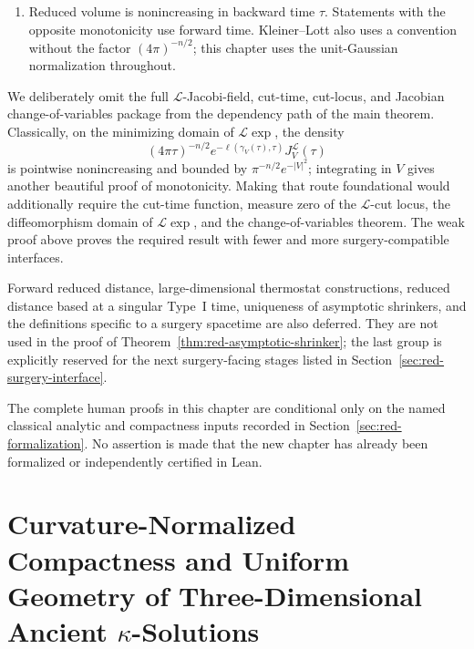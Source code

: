 \documentclass[10pt]{coll-l}
\theoremstyle{definition}
\theoremstyle{remark}
\numberwithin{section}{chapter}
\numberwithin{equation}{chapter}
\begin{document}
\begin{enumerate}
\item Reduced volume is nonincreasing in backward time $\tau$.  Statements
      with the opposite monotonicity use forward time.  Kleiner--Lott also
      uses a convention without the factor $(4\pi)^{-n/2}$; this chapter uses
      the unit-Gaussian normalization throughout.
\end{enumerate}

We deliberately omit the full $\mathcal L$-Jacobi-field, cut-time,
cut-locus, and Jacobian change-of-variables package from the dependency path
of the main theorem.  Classically, on the minimizing domain of
$\mathcal L\exp$, the density
\begin{equation}
 (4\pi\tau)^{-n/2}e^{-\ell(\gamma_V(\tau),\tau)}
                J_V^{\mathcal L}(\tau)                  \label{eq:red-classical-Jacobian-density}
\end{equation}
is pointwise nonincreasing and bounded by
$\pi^{-n/2}e^{-|V|^2}$; integrating in $V$ gives another beautiful proof of
monotonicity.  Making that route foundational would additionally require the
cut-time function, measure zero of the $\mathcal L$-cut locus, the
diffeomorphism domain of $\mathcal L\exp$, and the change-of-variables
theorem.  The weak proof above proves the required result with fewer and more
surgery-compatible interfaces.

Forward reduced distance, large-dimensional thermostat constructions,
reduced distance based at a singular Type~I time, uniqueness of asymptotic
shrinkers, and the definitions specific to a surgery spacetime are also
deferred.  They are not used in the proof of
Theorem~\ref{thm:red-asymptotic-shrinker}; the last group is explicitly
reserved for the next surgery-facing stages listed in
Section~\ref{sec:red-surgery-interface}.

The complete human proofs in this chapter are conditional only on the named
classical analytic and compactness inputs recorded in
Section~\ref{sec:red-formalization}.  No assertion is made that the new
chapter has already been formalized or independently certified in Lean.

\chapter[Compactness of Three-Dimensional Ancient Kappa-Solutions]
{Curvature-Normalized Compactness and Uniform Geometry of
Three-Dimensional Ancient $\kappa$-Solutions}
\label{ch:kappa-compactness}
\end{document}
